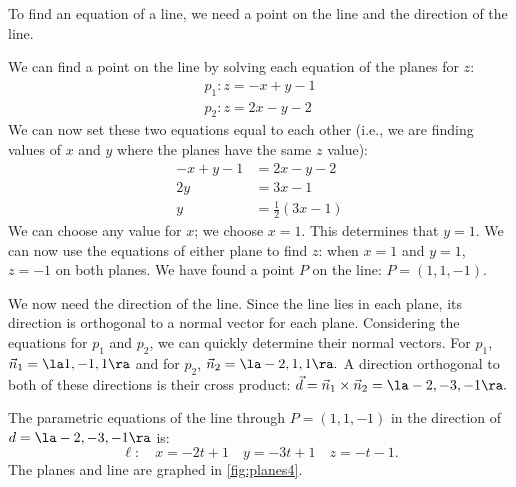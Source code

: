 {To find an equation of a line, we need a point on the line and the direction of the line. 

We can find a point on the line by solving each equation of the planes for $z$:
\begin{gather*}
p_1: z = -x+y-1 \\
p_2: z = 2x-y-2
\end{gather*}
We can now set these two equations equal to each other (i.e., we are finding values of $x$ and $y$ where the planes have the same $z$ value):
\begin{align*}
-x+y-1 &= 2x-y-2 \\
2y &= 3x-1\\
y &= \frac12(3x-1)
\end{align*}
We can choose any value for $x$; we choose $x=1$. This determines that $y=1$. We can now use the equations of either plane to find $z$: when $x=1$ and $y=1$, $z=-1$ on both planes. We have found a point $P$  on the line: $P= (1,1,-1)$. 

We now need the direction of the line. Since the line lies in each plane, its direction is orthogonal to a normal vector for each plane. Considering the equations for $p_1$ and $p_2$, we can quickly determine their normal vectors. For $p_1$, $\vec n_1 = \la 1,-1,1\ra$ and for $p_2$, $\vec n_2 = \la -2,1,1\ra.$ A direction orthogonal to both of these directions is their cross product: $\vec d = \vec n_1\times \vec n_2 = \la -2,-3,-1\ra.$

The parametric equations of the line through $P=(1,1,-1)$ in the direction of $d=\la -2,-3,-1\ra$ is:
$$\ell: \quad x= -2t+1\quad y = -3t+1\quad z=-t-1.$$
The planes and line are graphed in \autoref{fig:planes4}.
}

